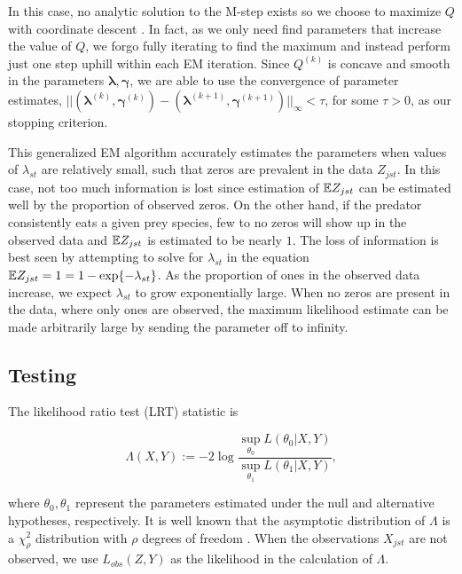 In this case, no analytic solution to the M-step exists so we choose to maximize $Q$ with coordinate descent \citep{Luo:1992}.  In fact, as we only need find parameters that increase the value of $Q$, we forgo fully iterating to find the maximum and instead perform just one step uphill within each EM iteration.  Since $Q^{(k)}$ is concave and smooth in the parameters $\boldsymbol{\lambda}, \boldsymbol{\gamma}$, we are able to use the convergence of parameter estimates, $||(\boldsymbol{\lambda}^{(k)}, \boldsymbol{\gamma}^{(k)}) - (\boldsymbol{\lambda}^{(k+1)}, \boldsymbol{\gamma}^{(k+1)})||_{\infty} < \tau $, for some $\tau>0$, as our stopping criterion.

This generalized EM algorithm accurately estimates the parameters when values of $\lambda_{st}$ are relatively small, such that zeros are prevalent in the data $Z_{jst}$.  In this case, not too much information is lost since estimation of $\mathbb{E} Z_{jst}$ can be estimated well by the proportion of observed zeros.  On the other hand, if the predator consistently eats a given prey species, few to no zeros will show up in the observed data and $\mathbb{E} Z_{jst}$ is estimated to be nearly $1$.  The loss of information is best seen by attempting to solve for $\lambda_{st}$ in the equation $\mathbb{E} Z_{jst} = 1 = 1 - \exp\{-\lambda_{st}\}$.  As the proportion of ones in the observed data increase, we expect $\lambda_{st}$ to grow exponentially large.  When no zeros are present in the data, where only ones are observed, the maximum likelihood estimate can be made arbitrarily large by sending the parameter off to infinity.  

\subsection{Testing}

The likelihood ratio test (LRT) statistic is

\begin{equation*}
  \label{eq:LRT}
    \Lambda(X,Y) := -2 \log{ \frac{ \sup_{\theta_0} L(\theta_0|X,Y)}{ \sup_{\theta_1} L(\theta_1|X,Y)} },
\end{equation*}

\noindent where $\theta_0, \theta_1$ represent the parameters estimated under the null and alternative hypotheses, respectively.  It is well known that the asymptotic distribution of $\Lambda$ is a $\chi_{\rho}^2$ distribution with $\rho$ degrees of freedom \citep{Wilks:1938}.  When the observations $X_{jst}$ are not observed, we use $L_{obs}(Z,Y)$ as the likelihood in the calculation of $\Lambda$.  

